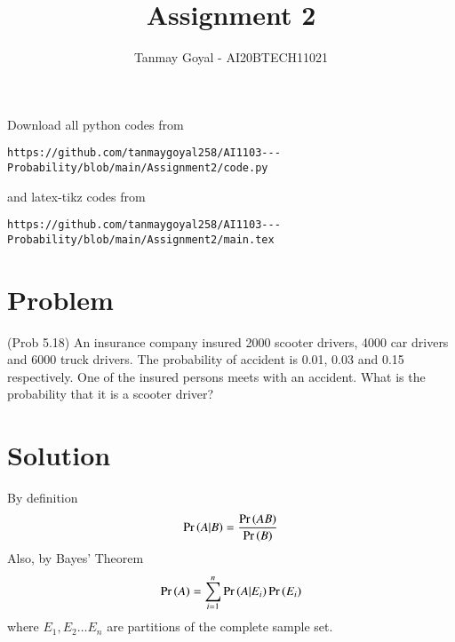 \documentclass[journal,12pt,twocolumn]{IEEEtran}
\begin{document}
\def\putbox#1#2#3{\makebox[0in][l]{\makebox[#1][l]{}\raisebox{\baselineskip}[0in][0in]{\raisebox{#2}[0in][0in]{#3}}}}
     \def\rightbox#1{\makebox[0in][r]{#1}}
     \def\centbox#1{\makebox[0in]{#1}}
     \def\topbox#1{\raisebox{-\baselineskip}[0in][0in]{#1}}
     \def\midbox#1{\raisebox{-0.5\baselineskip}[0in][0in]{#1}}
\vspace{3cm}
\title{Assignment 2}
\author{Tanmay Goyal - AI20BTECH11021}
\maketitle
\newpage
\bigskip
\renewcommand{\thefigure}{\theenumi}
\renewcommand{\thetable}{\theenumi}
Download all python codes from 
\begin{lstlisting}
https://github.com/tanmaygoyal258/AI1103---Probability/blob/main/Assignment2/code.py
\end{lstlisting}
%
and latex-tikz codes from 
%
\begin{lstlisting}
https://github.com/tanmaygoyal258/AI1103---Probability/blob/main/Assignment2/main.tex
\end{lstlisting}
\section{Problem}
(Prob 5.18) An insurance company insured 2000 scooter drivers, 4000 car drivers and 6000 truck drivers. The probability of accident is 0.01, 0.03 and 0.15 respectively. One of the insured persons meets with an accident. What is the probability that it is a scooter driver?\\

\section{Solution}
By definition
\begin{align}
\Pr\left(A|B\right) = \frac{\Pr\left(AB\right)}{\Pr\left(B\right)} \label{1}
\end{align}
Also, by Bayes' Theorem
\begin{align}
\Pr\left(A\right) = \sum_{i=1}^n \Pr\left(A|E_i\right)\Pr\left(E_i\right)\label{2}
\end{align}
where $E_1 , E_2 \ldots E_n$  are partitions of the complete sample set.\\
\end{document}
